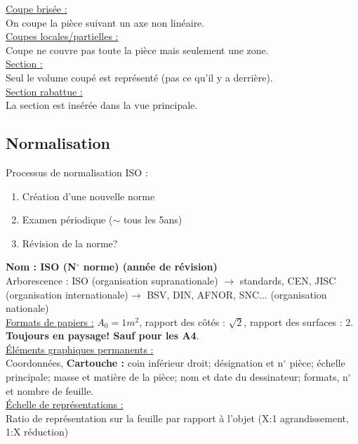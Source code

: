\documentclass[../main.tex]{subfiles}
\begin{document}
\quad \underline{Coupe brisée :}\\
On coupe la pièce suivant un axe non linéaire.\\

\quad \underline{Coupes locales/partielles :}\\
Coupe ne couvre pas toute la pièce mais seulement une zone.\\

\quad \underline{Section :}\\
Seul le volume coupé est représenté (pas ce qu'il y a derrière).\\

\quad \underline{Section rabattue :}\\
La section est insérée dans la vue principale.\\


\subsection{Normalisation}
Processus de normalisation ISO : 
\begin{enumerate}
    \item Création d'une nouvelle norme\\
    \item Examen périodique ($\sim$ tous les 5ans)\\
    \item Révision de la norme?\\
\end{enumerate}
\textbf{Nom : ISO (N$^{\circ}$ norme) (année de révision)}\\
Arborescence : ISO (organisation supranationale) $\rightarrow$ standards, CEN, JISC (organisation internationale)$\rightarrow$ BSV, DIN, AFNOR, SNC... (organisation nationale)\\

\underline{Formats de papiers :} $A_0 = 1m^2$, rapport des côtés : $\sqrt{2}$, rapport des surfaces : 2. \textbf{Toujours en paysage! Sauf pour les A4}.\\

\quad \underline{Éléments graphiques permanents :}\\
Coordonnées, \textbf{Cartouche :} coin inférieur droit; désignation et n$^{\circ}$ pièce; échelle principale; masse et matière de la pièce; nom et date du dessinateur; formats, n$^{\circ}$et nombre de feuille.\\

\quad \underline{Échelle de représentations :}\\
Ratio de représentation sur la feuille par rapport à l'objet (X:1 agrandissement, 1:X réduction)
\end{document}
